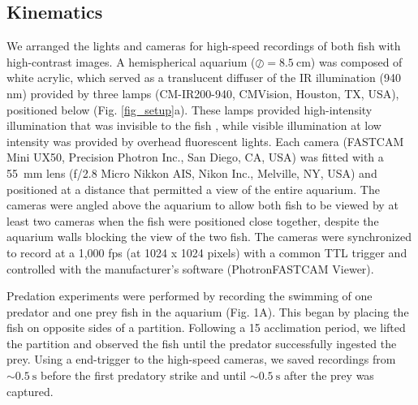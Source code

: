 \documentclass[]{rsos}%
\begin{document}
\subsection{Kinematics}
We arranged the lights and cameras for high-speed recordings of both fish with high-contrast images. 
A hemispherical aquarium ($\oslash = \SI{8.5}{\cm}$) was composed of white acrylic, which served as a translucent diffuser of the IR illumination (940 nm) provided by three lamps (CM-IR200-940, CMVision, Houston, TX, USA), positioned below (Fig. \ref{fig_setup}a). 
These lamps provided high-intensity illumination that was invisible to the fish \cite{Robinson:1993tu}, while visible illumination at low intensity was provided by overhead fluorescent lights.
Each camera (FASTCAM Mini UX50, Precision Photron Inc., San Diego, CA, USA) was fitted with a \SI{55}{\mm} lens (f/2.8 Micro Nikkon AIS, Nikon Inc., Melville, NY, USA) and positioned at a distance that permitted a view of the entire aquarium. 
The cameras were angled above the aquarium to allow both fish to be viewed by at least two cameras when the fish were positioned close together, despite the aquarium walls blocking the view of the two fish.
The cameras were synchronized to record at a 1,000 fps (at 1024 x 1024 pixels) with a common TTL trigger and controlled with the manufacturer's software (PhotronFASTCAM Viewer).

Predation experiments were performed by recording the swimming of one predator and one prey fish in the aquarium (Fig. 1A). 
This began by placing the fish on opposite sides of a partition.
Following a \SI{15}{\min} acclimation period, we lifted the partition and observed the fish until the predator successfully ingested the prey.
Using a end-trigger to the high-speed cameras, we saved recordings from $\sim \SI{0.5}{\s}$ before the first predatory strike and until $\sim \SI{0.5}{\s}$  after the prey was captured.
\end{document}
